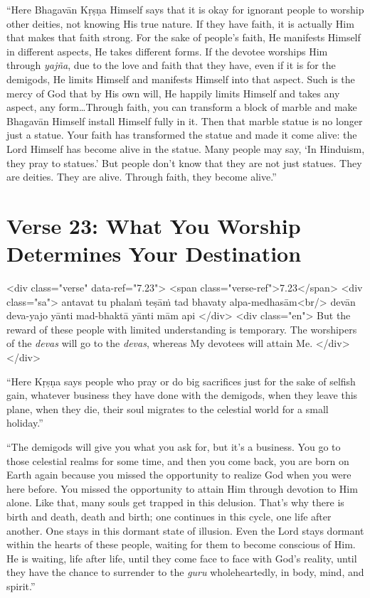\enquote{Here Bhagavān Kṛṣṇa Himself says that it is okay for ignorant people to worship other deities, not knowing His true nature. If they have faith, it is actually Him that makes that faith strong. For the sake of people’s faith, He manifests Himself in different aspects, He takes different forms. If the devotee worships Him through \textit{yajña}, due to the love and faith that they have, even if it is for the demigods, He limits Himself and manifests Himself into that aspect. Such is the mercy of God that by His own will, He happily limits Himself and takes any aspect, any form\ldots Through faith, you can transform a block of marble and make Bhagavān Himself install Himself fully in it. Then that marble statue is no longer just a statue. Your faith has transformed the statue and made it come alive: the Lord Himself has become alive in the statue. Many people may say, \enquote{In Hinduism, they pray to statues.} But people don’t know that they are not just statues. They are deities. They are alive. Through faith, they become alive.}

\section{Verse 23: What You Worship Determines Your Destination}\label{sec-verse-23-what-you-worship-determines-your-destination}


\begin{html}
<div class="verse" data-ref="7.23">
  <span class="verse-ref">7.23</span>
  <div class="sa">
    antavat tu phalaṁ teṣāṁ tad bhavaty alpa-medhasām<br/>
    devān deva-yajo yānti mad-bhaktā yānti mām api
  </div>
  <div class="en">
    But the reward of these people with limited understanding is temporary. The worshipers of the \textit{devas} will go to the \textit{devas}, whereas My devotees will attain Me.
  </div>
</div>
\end{html}


\enquote{Here Kṛṣṇa says people who pray or do big sacrifices just for the sake of selfish gain, whatever business they have done with the demigods, when they leave this plane, when they die, their soul migrates to the celestial world for a small holiday.}

\enquote{The demigods will give you what you ask for, but it’s a business. You go to those celestial realms for some time, and then you come back, you are born on Earth again because you missed the opportunity to realize God when you were here before. You missed the opportunity to attain Him through devotion to Him alone. Like that, many souls get trapped in this delusion. That’s why there is birth and death, death and birth; one continues in this cycle, one life after another. One stays in this dormant state of illusion. Even the Lord stays dormant within the hearts of these people, waiting for them to become conscious of Him. He is waiting, life after life, until they come face to face with God’s reality, until they have the chance to surrender to the \textit{guru} wholeheartedly, in body, mind, and spirit.}

